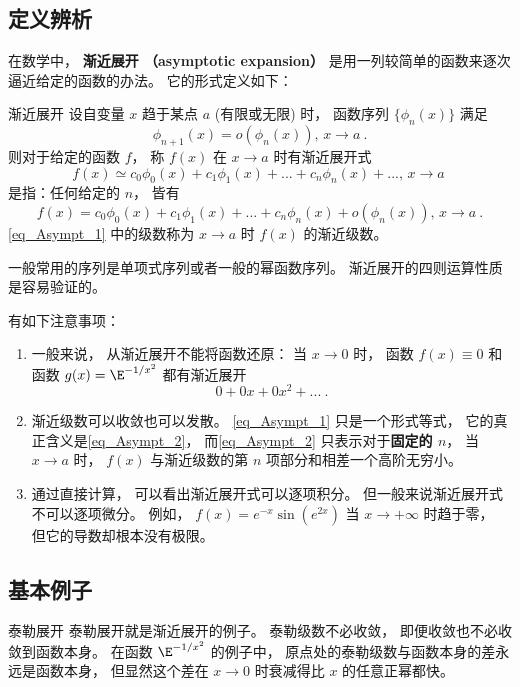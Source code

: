 

\subsection{定义辨析}\label{sub_Asympt_1}
在数学中， \textbf{渐近展开 （asymptotic expansion）} 是用一列较简单的函数来逐次逼近给定的函数的办法。 它的形式定义如下：

\begin{definition}{渐近展开}
设自变量 $x$ 趋于某点 $a$ (有限或无限) 时， 函数序列 $\{\phi_{n}(x)\}$ 满足
$$
\phi_{n+1}(x)=o(\phi_n(x)),\,x\to a~.
$$
则对于给定的函数 $f$， 称 $f(x)$ 在 $x\to a$ 时有渐近展开式
\begin{equation}\label{eq_Asympt_1}
f(x)\simeq c_0\phi_0(x)+c_1\phi_1(x)+...+c_n\phi_n(x)+...,\,x\to a~
\end{equation}
是指：任何给定的 $n$， 皆有
\begin{equation}\label{eq_Asympt_2}
f(x)=c_0\phi_0(x)+c_1\phi_1(x)+...+c_n\phi_n(x)+o(\phi_n(x)),\,x\to a~.
\end{equation}
\autoref{eq_Asympt_1} 中的级数称为 $x\to a$ 时 $f(x)$ 的渐近级数。
\end{definition}

一般常用的序列是单项式序列或者一般的幂函数序列。 渐近展开的四则运算性质是容易验证的。

有如下注意事项：
\begin{enumerate}
\item 一般来说， 从渐近展开不能将函数还原： 当 $x\to0$ 时， 函数 $f(x)\equiv 0$ 和函数 $g(x)=\E^{-1/x^2}$ 都有渐近展开
$$
0+0x+0x^2+...~.
$$

\item 渐近级数可以收敛也可以发散。 \autoref{eq_Asympt_1} 只是一个形式等式， 它的真正含义是\autoref{eq_Asympt_2}，  而\autoref{eq_Asympt_2} 只表示对于\textbf{固定的 $n$}， 当 $x\to a$ 时， $f(x)$ 与渐近级数的第 $n$ 项部分和相差一个高阶无穷小。 

\item 通过直接计算， 可以看出渐近展开式可以逐项积分。 但一般来说渐近展开式不可以逐项微分。 例如， $f(x)=e^{-x}\sin(e^{2x})$ 当 $x\to+\infty$ 时趋于零， 但它的导数却根本没有极限。
\end{enumerate}

\subsection{基本例子}
\begin{example}{泰勒展开}
泰勒展开就是渐近展开的例子。 泰勒级数不必收敛， 即便收敛也不必收敛到函数本身。 在函数 $\E^{-1/x^2}$ 的例子中， 原点处的泰勒级数与函数本身的差永远是函数本身， 但显然这个差在 $x\to0$ 时衰减得比 $x$ 的任意正幂都快。
\end{example}

